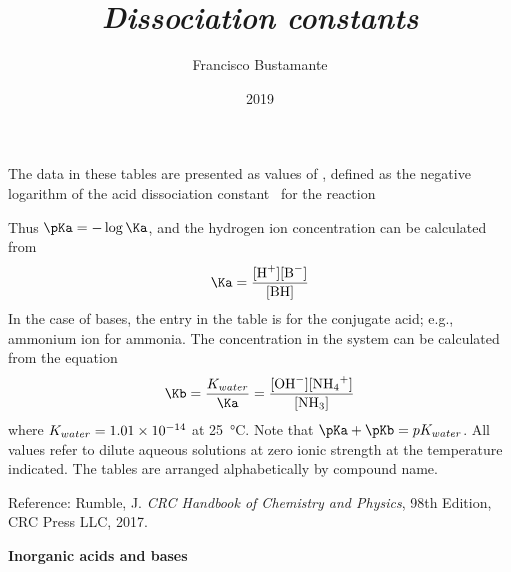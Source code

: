 \documentclass[a4paper, 10pt]{article}
\author{Francisco Bustamante}
\title{\textit{Dissociation constants}}
\date{2019}
\begin{document}
\small

\twocolumn

The data in these tables are presented as values of \pKa, defined as the negative
logarithm of the acid dissociation constant \Ka\, for the reaction 

Thus $\pKa = -\log \Ka$, and the hydrogen ion concentration \ce{[H+]} can be
calculated from
%
\begin{align*}
    \Ka = \frac{\ce{[H^+][B^-]}}{\ce{[BH]}}
\end{align*}
%
In the case of bases, the entry in the table is for the conjugate acid; e.g.,
ammonium ion for ammonia. The  concentration in the system
 can be calculated from the equation
%
\begin{align*}
    \Kb = \frac{K_{water}}{\Ka} = \frac{\ce{[OH^-][NH4^+]}}{\ce{[NH3]}}
\end{align*}
%
where $K_{water} = \num{1.01d-14}$ at \SI{25}{\celsius}. Note that
$\pKa + \pKb = pK_{water}$. All values refer to dilute aqueous solutions at zero
ionic strength at the temperature indicated. The tables are arranged
alphabetically by compound name.

Reference: Rumble, J. \textit{CRC Handbook of Chemistry and Physics}, 98th
Edition, CRC Press LLC, 2017.

\begin{center}
    \begin{large}
        \textbf{Inorganic acids and bases}
    \end{large}
\end{center}

\end{document}

